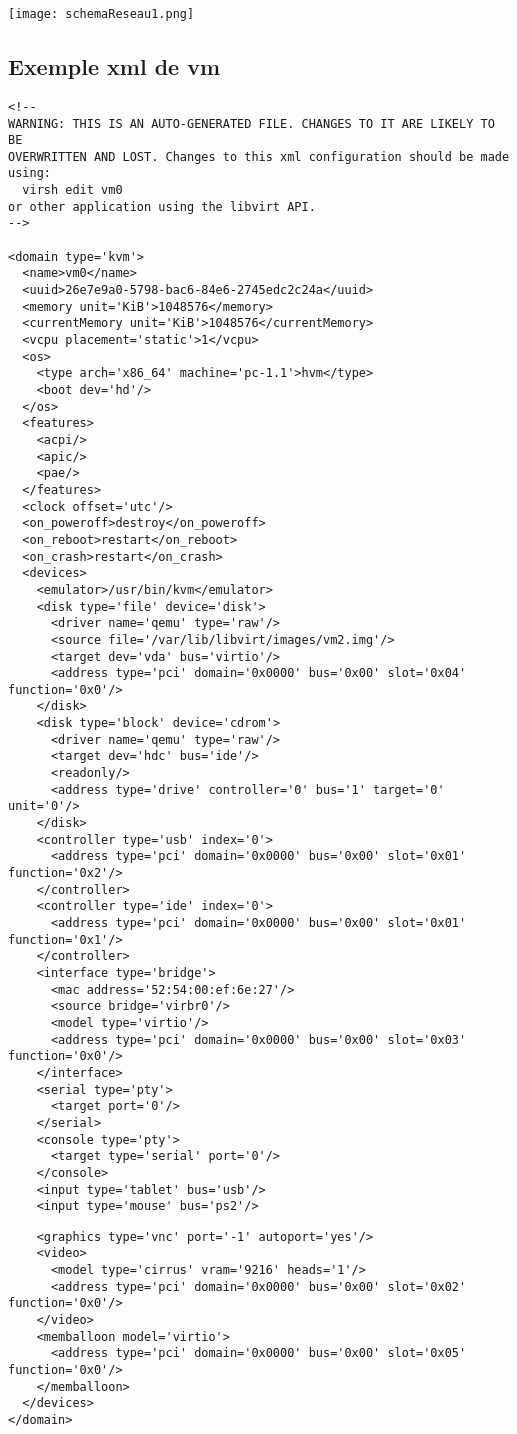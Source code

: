 	\vspace{-0.3cm}	
	\begin{center}
		\texttt{[image: schemaReseau1.png]}
	\end{center}

\newpage


	\subsection{\label{xmlVm0}Exemple xml de vm}
	\vspace{0.3cm}
\begin{verbatim}
<!--
WARNING: THIS IS AN AUTO-GENERATED FILE. CHANGES TO IT ARE LIKELY TO BE 
OVERWRITTEN AND LOST. Changes to this xml configuration should be made using:
  virsh edit vm0
or other application using the libvirt API.
-->

<domain type='kvm'>
  <name>vm0</name>
  <uuid>26e7e9a0-5798-bac6-84e6-2745edc2c24a</uuid>
  <memory unit='KiB'>1048576</memory>
  <currentMemory unit='KiB'>1048576</currentMemory>
  <vcpu placement='static'>1</vcpu>
  <os>
    <type arch='x86_64' machine='pc-1.1'>hvm</type>
    <boot dev='hd'/>
  </os>
  <features>
    <acpi/>
    <apic/>
    <pae/>
  </features>
  <clock offset='utc'/>
  <on_poweroff>destroy</on_poweroff>
  <on_reboot>restart</on_reboot>
  <on_crash>restart</on_crash>
  <devices>
    <emulator>/usr/bin/kvm</emulator>
    <disk type='file' device='disk'>
      <driver name='qemu' type='raw'/>
      <source file='/var/lib/libvirt/images/vm2.img'/>
      <target dev='vda' bus='virtio'/>
      <address type='pci' domain='0x0000' bus='0x00' slot='0x04' function='0x0'/>
    </disk>
    <disk type='block' device='cdrom'>
      <driver name='qemu' type='raw'/>
      <target dev='hdc' bus='ide'/>
      <readonly/>
      <address type='drive' controller='0' bus='1' target='0' unit='0'/>
    </disk>
    <controller type='usb' index='0'>
      <address type='pci' domain='0x0000' bus='0x00' slot='0x01' function='0x2'/>
    </controller>
    <controller type='ide' index='0'>
      <address type='pci' domain='0x0000' bus='0x00' slot='0x01' function='0x1'/>
    </controller>
    <interface type='bridge'>
      <mac address='52:54:00:ef:6e:27'/>
      <source bridge='virbr0'/>
      <model type='virtio'/>
      <address type='pci' domain='0x0000' bus='0x00' slot='0x03' function='0x0'/>
    </interface>
    <serial type='pty'>
      <target port='0'/>
    </serial>
    <console type='pty'>
      <target type='serial' port='0'/>
    </console>
    <input type='tablet' bus='usb'/>
    <input type='mouse' bus='ps2'/>
\end{verbatim}
\begin{verbatim}
    <graphics type='vnc' port='-1' autoport='yes'/>
    <video>
      <model type='cirrus' vram='9216' heads='1'/>
      <address type='pci' domain='0x0000' bus='0x00' slot='0x02' function='0x0'/>
    </video>
    <memballoon model='virtio'>
      <address type='pci' domain='0x0000' bus='0x00' slot='0x05' function='0x0'/>
    </memballoon>
  </devices>
</domain>
\end{verbatim}

